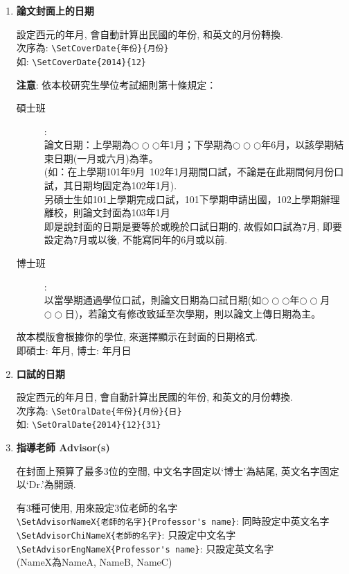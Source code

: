 \begin{enumerate}
  \item
  {
    \textbf{論文封面上的日期}

    設定西元的年月, 會自動計算出民國的年份, 和英文的月份轉換.\\
    次序為: \verb|\SetCoverDate{年份}{月份}|\\
    如: \verb|\SetCoverDate{2014}{12}|

    \textbf{注意}: 依本校研究生學位考試細則第十條規定：
      \begin{description}
        \item[碩士班]: \hfill\\
          論文日期：上學期為$\bigcirc\bigcirc\bigcirc$年1月；下學期為$\bigcirc\bigcirc\bigcirc$年6月，以該學期結束日期(一月或六月)為準。\\
          (如：在上學期101年9月~102年1月期間口試，不論是在此期間何月份口試，其日期均固定為102年1月).\\
          另碩士生如101上學期完成口試，101下學期申請出國，102上學期辦理離校，則論文封面為103年1月\\
          即是說封面的日期是要等於或晚於口試日期的, 故假如口試為7月, 即要設定為7月或以後, 不能寫同年的6月或以前.

        \item[博士班]: \hfill\\
        以當學期通過學位口試，則論文日期為口試日期(如$\bigcirc\bigcirc\bigcirc$年$\bigcirc\bigcirc$月$\bigcirc\bigcirc$日)，若論文有修改致延至次學期，則以論文上傳日期為主。
      \end{description}
    故本模版會根據你的學位, 來選擇顯示在封面的日期格式.\\
    即碩士: 年月, 博士: 年月日
  } %

  \item
  {
    \textbf{口試的日期}

    設定西元的年月日, 會自動計算出民國的年份, 和英文的月份轉換.\\
    次序為: \verb|\SetOralDate{年份}{月份}{日}|\\
    如: \verb|\SetOralDate{2014}{12}{31}|
  } %

  \item
  {
    \textbf{指導老師 Advisor(s)}

    在封面上預算了最多3位的空間, 中文名字固定以`博士'為結尾, 英文名字固定以`Dr.'為開頭.

    有3種可使用, 用來設定3位老師的名字\\
    \verb|\SetAdvisorNameX{老師的名字}{Professor's name}|: 同時設定中英文名字\\
    \verb|\SetAdvisorChiNameX{老師的名字}|: 只設定中文名字\\
    \verb|\SetAdvisorEngNameX{Professor's name}|: 只設定英文名字\\
    (NameX為NameA, NameB, NameC)

}
\end{enumerate}
